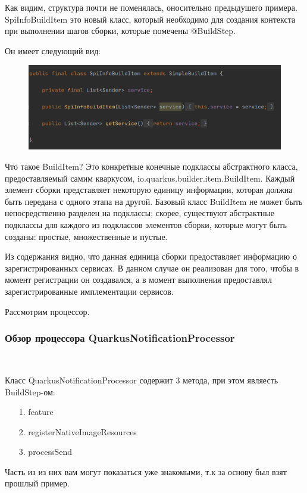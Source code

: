 \documentclass[russian,11pt]{article}
\begin{document}
Как видим, структура почти не поменялась, оносительно предыдушего примера. SpiInfoBuildItem это новый класс, который необходимо для создания контекста при выполнении шагов сборки, которые помечены @BuildStep. 

Он имеет следующий вид:

\begin{figure}[H]
	\centering
	\includegraphics[width=\textwidth]{18}
\end{figure}

Что такое BuildItem? Это конкретные конечные подклассы абстрактного класса, предоставляемый самим кваркусом, io.quarkus.builder.item.BuildItem. Каждый элемент сборки представляет некоторую единицу информации, которая должна быть передана с одного этапа на другой. Базовый класс BuildItem не может быть непосредственно разделен на подклассы; скорее, существуют абстрактные подклассы для каждого из подклассов элементов сборки, которые могут быть созданы: простые, множественные и пустые.

Из содержания видно, что данная единица сборки предоставляет информацию о зарегистрированных сервисах. В данном случае он реализован для того, чтобы в момент регистрации он создавался, а в момент выполнения предоставлял зарегистрированные имплементации сервисов.

Рассмотрим процессор.

\subsubsection{Обзор процессора QuarkusNotificationProcessor}
~

Класс QuarkusNotificationProcessor содержит 3 метода, при этом являесть BuildStep-ом:
\begin{enumerate}
		\item[  1.] feature
		\item[  2.] registerNativeImageResources
		\item[  3.] processSend
\end{enumerate}

Часть из из них вам могут показаться уже знакомыми, т.к за основу был взят прошлый пример.
\end{document}
